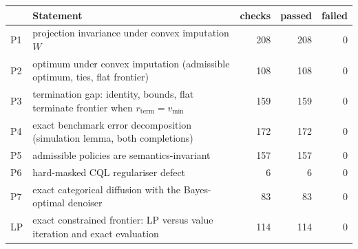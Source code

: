 \begin{tabular}{llrrr}
\toprule
& Statement & checks & passed & failed \\
\midrule
P1 & projection invariance under convex imputation $W$ & 208 & 208 & 0 \\
P2 & optimum under convex imputation (admissible optimum, ties, flat frontier) & 108 & 108 & 0 \\
P3 & termination gap: identity, bounds, flat terminate frontier when $r_{\mathrm{term}}=v_{\min}$ & 159 & 159 & 0 \\
P4 & exact benchmark error decomposition (simulation lemma, both completions) & 172 & 172 & 0 \\
P5 & admissible policies are semantics-invariant & 157 & 157 & 0 \\
P6 & hard-masked CQL regulariser defect & 6 & 6 & 0 \\
P7 & exact categorical diffusion with the Bayes-optimal denoiser & 83 & 83 & 0 \\
LP & exact constrained frontier: LP versus value iteration and exact evaluation & 114 & 114 & 0 \\
\bottomrule
\end{tabular}
